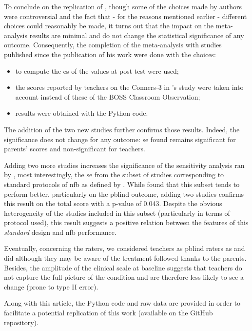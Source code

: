 To conclude on the replication of \citet{Cortese2016}, though some of the choices made by authors
were controversial and the fact that - for the reasons mentioned earlier - different choices could reasonably be made, 
it turns out that the impact on the meta-analysis results are minimal and do not change the statistical significance of any outcome. 
Consequently, the completion of the meta-analysis with studies published since the publication of his work were done with the choices: 
\begin{itemize} 
	\item to compute the \gls{es} of \citet{Arnold2014} the values at post-test were used;
	\item the scores reported by teachers on the Conners-3 in \citeauthor{Steiner2014}'s study were taken into account instead of these of 
	the BOSS Classroom Observation;
	\item results were obtained with the Python code.
\end{itemize} 

The addition of the two new studies \citep{Strehl2017, Baumeister2016} further confirms those results. Indeed, 
the significance does not change for any outcome: \gls{se} found remains significant for parents' scores and 
non-significant for teachers. 

Adding two more studies increases the significance of the sensitivity analysis ran by \citeauthor{Cortese2016}, 
most interestingly, the \gls{se} from the subset of studies corresponding to standard protocols of \gls{nfb} as 
defined by \citet{Arns2014}. While \citeauthor{Cortese2016} found that this subset tends to perform better, particularly
 on the \gls{pblind} outcome, adding two studies confirms this result on the total score with a p-value of 0.043. 
Despite the obvious heterogeneity of the studies included in this subset (particularly in terms of protocol used), 
this result suggests a positive relation between the features of this \emph{standard} design and \gls{nfb} performance.

Eventually, concerning the raters, we considered teachers as \gls{pblind} raters as \citeauthor{Cortese2016} and 
\citeauthor{Micoulaud2014} did although they may be aware of the treatment followed thanks to the parents. 
Besides, the amplitude of the clinical scale at baseline suggests that teachers do not capture the full picture of 
the condition and are therefore less likely to see a change (prone to type II error).

Along with this article, the Python code and raw data are provided in order to facilitate a potential replication of this work
(available on the GitHub repository).  

